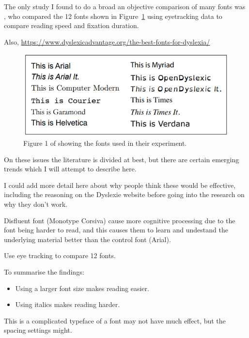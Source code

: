 \documentclass[17pt]{memoir}
\begin{document}
The only study I found to do a broad an objective comparison of many fonts was \cite{Rello2013}, who compared the 12 fonts shown in Figure~\ref{fig:RelloFonts} using eyetracking data to compare reading speed and fixation duration. 

Also, \href{https://www.dyslexicadvantage.org/the-best-fonts-for-dyslexia/
}{https://www.dyslexicadvantage.org/the-best-fonts-for-dyslexia/
}

\begin{figure}

\begin{center}
\includegraphics{figures/RolloFonts.PNG}
\end{center}

\caption{Figure 1 of \cite{Rello2013} showing the fonts used in their experiment. \label{fig:RelloFonts}}
\end{figure}


On these issues the literature is divided at best, but there are certain emerging trends which I will attempt to describe here. 


I could add more detail here about why people think these would be effective, including the reasoning on the Dyslexie website before going into the research on why they don't work.


\cite{French2013}
Disfluent font (Monotype Corsiva) cause more cognitive processing due to the font being harder to read, and this causes them to learn and undestand the underlying material better than the control font (Arial).

Use eye tracking to compare 12 fonts. 


To summarise the findings:
\begin{itemize}
	\item Using a larger font size makes reading easier.
	\item Using italics makes reading harder.
\end{itemize}
This is a complicated  typeface of a font may not have much effect, but the spacing settings might.
\end{document}
